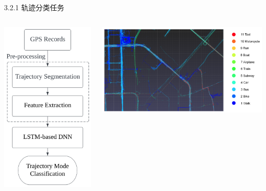\documentclass{sintefbeamer}
\begin{document}
\begin{frame}{3.2.1 轨迹分类任务}
\begin{columns}
\begin{column}{0.4\textwidth}\centering
\includegraphics[height=1\textheight]{images/traj-cls}
\end{column}
\begin{column}{0.6\textwidth}
\includegraphics[width=1\textwidth]{images/tul-cls}

\end{column}
\end{columns}
\end{frame}
\end{document}
